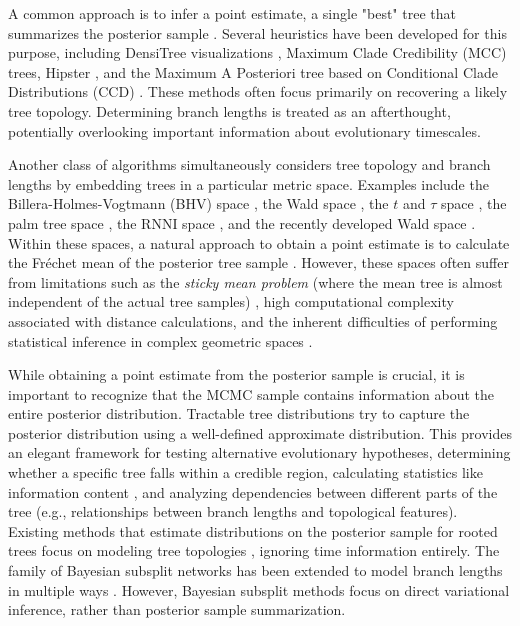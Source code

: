 \documentclass[10pt,letterpaper]{article}
\begin{document}
A common approach is to infer a point estimate, a single "best" tree that summarizes the posterior sample \cite{treesinforest}. Several heuristics have been developed for this purpose, including DensiTree visualizations \cite{densitree}, Maximum Clade Credibility (MCC) trees, Hipster \cite{hipstr}, and the Maximum A Posteriori tree based on Conditional Clade Distributions (CCD) \cite{ccd,ccdlarget}. These methods often focus primarily on recovering a likely tree topology. Determining branch lengths is treated as an afterthought, potentially overlooking important information about evolutionary timescales.

Another class of algorithms simultaneously considers tree topology and branch lengths by embedding trees in a particular metric space. Examples include the Billera-Holmes-Vogtmann (BHV) space \cite{bhv}, the Wald space \cite{wald}, the $t$ and $\tau$ space \cite{tauspace}, the palm tree space \cite{tropical}, the RNNI space \cite{rnnispace}, and the recently developed Wald space \cite{wald}. Within these spaces, a natural approach to obtain a point estimate is to calculate the Fréchet mean of the posterior tree sample \cite{frechetmeanvar}. However, these spaces often suffer from limitations such as the \emph{sticky mean problem} (where the mean tree is almost independent of the actual tree samples) \cite{sticky}, high computational complexity associated with distance calculations, and the inherent difficulties of performing statistical inference in complex geometric spaces \cite{riemanngaussian}.

While obtaining a point estimate from the posterior sample is crucial, it is important to recognize that the MCMC sample contains information about the entire posterior distribution. Tractable tree distributions \cite{ccd} try to capture the posterior distribution using a well-defined approximate distribution. This provides an elegant framework for testing alternative evolutionary hypotheses, determining whether a specific tree falls within a credible region, calculating statistics like information content \cite{informationcontent}, and analyzing dependencies between different parts of the tree (e.g., relationships between branch lengths and topological features). Existing methods that estimate distributions on the posterior sample for rooted trees focus on modeling tree topologies \cite{ccd,ccdlarget}, ignoring time information entirely. The family of Bayesian subsplit networks \cite{subsplit} has been extended to model branch lengths in multiple ways \cite{subsplitnf,subsplitbranchlengths,artree}. However, Bayesian subsplit methods focus on direct variational inference, rather than posterior sample summarization.
\end{document}
